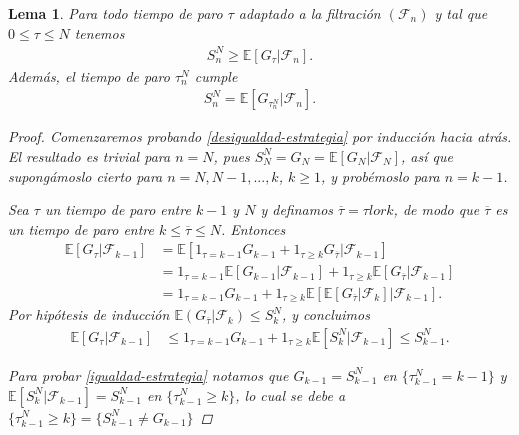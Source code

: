 \documentclass{article}
\newtheorem{lema}[theorem]{Lema}
\numberwithin{equation}{section}
\begin{document}
\begin{lema}\label{lema1}
    Para todo tiempo de paro $\tau$ adaptado a la filtración $(\mathcal{F}_n)$ y tal que $0\leq \tau \leq N$ tenemos
    \begin{align}\label{desigualdad-estrategia}
        S_n^N \geq \mathbb{E}\left[G_\tau|\mathcal{F}_n\right].
    \end{align}
    Además, el tiempo de paro $\tau_n^N$ cumple
    \begin{align}\label{igualdad-estrategia}
        S_n^N = \mathbb{E}\left[G_{\tau_n^N}|\mathcal{F}_n\right].
    \end{align}
    
\begin{proof}
    Comenzaremos probando \eqref{desigualdad-estrategia} por inducción hacia atrás. El resultado es trivial para $n = N$, pues $S_N^N = G_N = \mathbb{E}\left[G_N | \mathcal{F}_N\right]$, así que supongámoslo cierto para $n = N,N-1,...,k$, $k\geq 1$, y probémoslo para $n = k-1$.

    Sea $\tau$ un tiempo de paro entre $k-1$ y $N$ y definamos $\overline{\tau} = \tau lor k$, de modo que $\overline{\tau}$ es un tiempo de paro entre $k\leq \overline{\tau}\leq N$. Entonces
    \begin{align*}
        \mathbb{E}\left[G_\tau | \mathcal{F}_{k-1}\right] &= \mathbb{E}\left[1_{\tau = k-1}G_{k-1} + 1_{\tau\geq k}G_{\overline{\tau}} | \mathcal{F}_{k-1} \right]\\
        &= 1_{\tau = k-1}\mathbb{E}\left[G_{k-1} | \mathcal{F}_{k-1}\right] + 1_{\tau\geq k}\mathbb{E}\left[G_{\overline{\tau}} | \mathcal{F}_{k-1} \right]\\
        &= 1_{\tau = k-1}G_{k-1} + 1_{\tau\geq k}\mathbb{E}\left[\mathbb{E}\left[G_{\overline{\tau}} | \mathcal{F}_{k} \right] | \mathcal{F}_{k-1}  \right].
    \end{align*}
    Por hipótesis  de inducción $\mathbb{E}(G_{\overline{\tau}} | \mathcal{F}_k) \leq S^N_{k}$, y
    concluimos
    \begin{align*}
        \mathbb{E}\left[G_\tau | \mathcal{F}_{k-1}\right] &\leq 1_{\tau = k-1}G_{k-1} + 1_{\tau\geq k}\mathbb{E}\left[S_k^N | \mathcal{F}_{k-1} \right] 
        \leq S_{k-1}^N.
    \end{align*}

Para probar \eqref{igualdad-estrategia} notamos que $G_{k-1} = S^N_{k-1}$ en $\{\tau^N_{k-1} = k-1\}$ y $\mathbb{E}\left[S_k^N | \mathcal{F}_{k-1}\right] = S^N_{k-1}$ en $\{\tau^N_{k-1} \geq k\}$, lo cual se debe a  $\{\tau_{k-1}^N \geq k\} = \{S_{k-1}^N \not = G_{k-1} \}$


\end{proof}
\end{lema}
\end{document}
